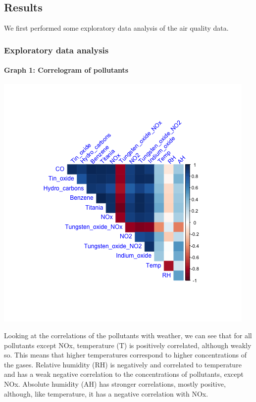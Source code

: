 \documentclass[]{article}
\let\oldparagraph\paragraph
\renewcommand{\paragraph}[1]{\oldparagraph{#1}\mbox{}}
\begin{document}
\hypertarget{results}{%
\subsection{Results}\label{results}}

We first performed some exploratory data analysis of the air quality
data.

\hypertarget{exploratory-data-analysis}{%
\subsubsection{Exploratory data
analysis}\label{exploratory-data-analysis}}

\hypertarget{graph-1-correlogram-of-pollutants}{%
\paragraph{Graph 1: Correlogram of
pollutants}\label{graph-1-correlogram-of-pollutants}}

\includegraphics{../Images/correlation.png}

Looking at the correlations of the pollutants with weather, we can see
that for all pollutants except NOx, temperature (T) is positively
correlated, although weakly so. This means that higher temperatures
correspond to higher concentrations of the gases. Relative humidity (RH)
is negatively and correlated to temperature and has a weak negative
correlation to the concentrations of pollutants, except NOx. Absolute
humidity (AH) has stronger correlations, mostly positive, although, like
temperature, it has a negative correlation with NOx.
\end{document}
